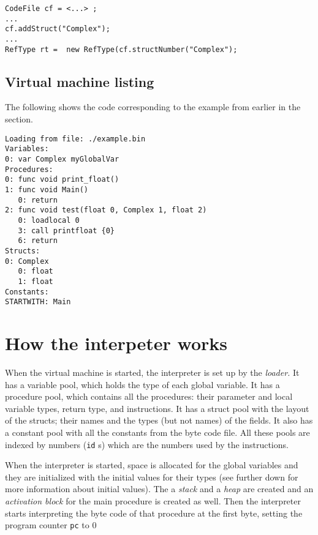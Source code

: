 \documentclass[11pt]{article}
\begin{document}
\lstset{language=java,label= ,caption= ,captionpos=b,numbers=none}
\begin{lstlisting}
CodeFile cf = <...> ;
...
cf.addStruct("Complex");
...
RefType rt =  new RefType(cf.structNumber("Complex");
\end{lstlisting}



\subsection{Virtual machine listing}
\label{sec:org1e8983d}
\label{org629e8fd}   


The following shows the code corresponding to the example from earlier in
the section.

\begin{verbatim}
Loading from file: ./example.bin
Variables:
0: var Complex myGlobalVar
Procedures:
0: func void print_float()
1: func void Main()
   0: return
2: func void test(float 0, Complex 1, float 2)
   0: loadlocal 0
   3: call printfloat {0}
   6: return
Structs:
0: Complex
   0: float
   1: float
Constants:
STARTWITH: Main
\end{verbatim}
\section{How the interpeter works}
\label{sec:org6832c05}
\label{orgdfdbe1b}       

When the virtual machine is started, the interpreter is set up by the
\emph{loader.} It has a variable pool, which holds the type of each global
variable. It has a procedure pool, which contains all the procedures: their
parameter and local variable types, return type, and instructions. It has a
struct pool with the layout of the structs; their names and the types (but
not names) of the fields. It also has a constant pool with all the
constants from the byte code file. All these pools are indexed by numbers
(\texttt{id} s) which are the numbers used by the instructions.


When the interpreter is started, space is allocated for the global
variables and they are initialized with the initial values for their types
(see further down for more information about initial values). The a \emph{stack}
and a \emph{heap} are created and an \emph{activation block} for the main procedure
is created as well. Then the interpreter starts interpreting the byte code
of that procedure at the first byte, setting the program counter \texttt{pc} to
\(0\)
\end{document}
